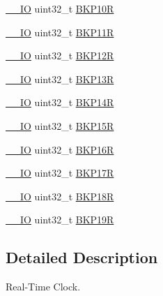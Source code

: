 \begin{DoxyCompactItemize}
\hyperlink{group___c_m_s_i_s__core__definitions_gaec43007d9998a0a0e01faede4133d6be}{\+\_\+\+\_\+\+IO} uint32\+\_\+t \hyperlink{struct_r_t_c___type_def_aade2881a3e408bfd106b27f78bbbcfc9}{B\+K\+P10R}
\item 
\hyperlink{group___c_m_s_i_s__core__definitions_gaec43007d9998a0a0e01faede4133d6be}{\+\_\+\+\_\+\+IO} uint32\+\_\+t \hyperlink{struct_r_t_c___type_def_ac66d5e2d3459cff89794c47dbc8f7228}{B\+K\+P11R}
\item 
\hyperlink{group___c_m_s_i_s__core__definitions_gaec43007d9998a0a0e01faede4133d6be}{\+\_\+\+\_\+\+IO} uint32\+\_\+t \hyperlink{struct_r_t_c___type_def_a6f7eee5ae8a32c07f9c8fe14281bdaf3}{B\+K\+P12R}
\item 
\hyperlink{group___c_m_s_i_s__core__definitions_gaec43007d9998a0a0e01faede4133d6be}{\+\_\+\+\_\+\+IO} uint32\+\_\+t \hyperlink{struct_r_t_c___type_def_a6ed4c3a0d4588a75078e9f8e376b4d06}{B\+K\+P13R}
\item 
\hyperlink{group___c_m_s_i_s__core__definitions_gaec43007d9998a0a0e01faede4133d6be}{\+\_\+\+\_\+\+IO} uint32\+\_\+t \hyperlink{struct_r_t_c___type_def_ac60f13e6619724747e61cfbff55b9fab}{B\+K\+P14R}
\item 
\hyperlink{group___c_m_s_i_s__core__definitions_gaec43007d9998a0a0e01faede4133d6be}{\+\_\+\+\_\+\+IO} uint32\+\_\+t \hyperlink{struct_r_t_c___type_def_afafaddc3a983eb71332b7526d82191ad}{B\+K\+P15R}
\item 
\hyperlink{group___c_m_s_i_s__core__definitions_gaec43007d9998a0a0e01faede4133d6be}{\+\_\+\+\_\+\+IO} uint32\+\_\+t \hyperlink{struct_r_t_c___type_def_ad2f2eb2fb4b93e21515b10e920e719b6}{B\+K\+P16R}
\item 
\hyperlink{group___c_m_s_i_s__core__definitions_gaec43007d9998a0a0e01faede4133d6be}{\+\_\+\+\_\+\+IO} uint32\+\_\+t \hyperlink{struct_r_t_c___type_def_a2842aa523df62f3508316eb3b2e08f4e}{B\+K\+P17R}
\item 
\hyperlink{group___c_m_s_i_s__core__definitions_gaec43007d9998a0a0e01faede4133d6be}{\+\_\+\+\_\+\+IO} uint32\+\_\+t \hyperlink{struct_r_t_c___type_def_a640ccb2ccfb6316b88c070362dc29339}{B\+K\+P18R}
\item 
\hyperlink{group___c_m_s_i_s__core__definitions_gaec43007d9998a0a0e01faede4133d6be}{\+\_\+\+\_\+\+IO} uint32\+\_\+t \hyperlink{struct_r_t_c___type_def_a4ec1dd54d976989b7c9e59fb14d974fb}{B\+K\+P19R}
\end{DoxyCompactItemize}


\subsection{Detailed Description}
Real-\/\+Time Clock. 

